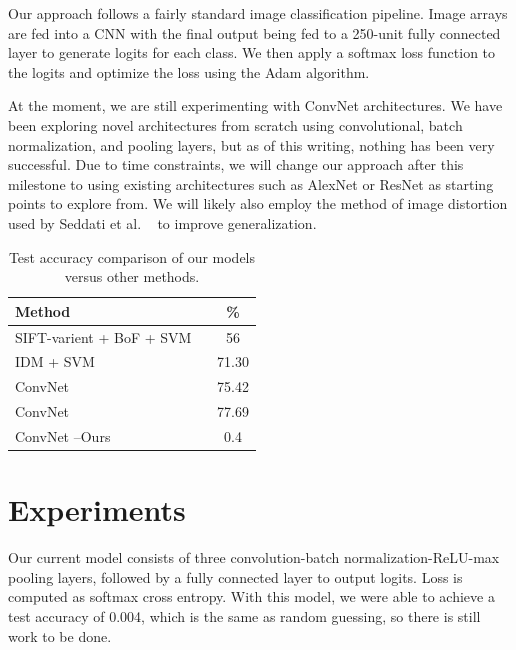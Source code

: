 \documentclass[10pt,twocolumn,letterpaper]{article}
\begin{document}
Our approach follows a fairly standard image classification pipeline. Image arrays are fed into a CNN with the final output being fed to a 250-unit fully connected layer to generate logits for each class. We then apply a softmax loss function to the logits and optimize the loss using the Adam algorithm.

At the moment, we are still experimenting with ConvNet architectures. We have been exploring novel architectures from scratch using convolutional, batch normalization, and pooling layers, but as of this writing, nothing has been very successful. Due to time constraints, we will change our approach after this milestone to using existing architectures such as AlexNet or ResNet as starting points to explore from. We will likely also employ the method of image distortion used by Seddati et al. ~\cite{seddati2015deepsketch} to improve generalization.

\begin{table}[h]
\begin{center}
\begin{tabular}{|l|c|}
\hline
Method & \% \\
\hline\hline
SIFT-varient + BoF + SVM  ~\cite{eitz2012hdhso}  &  56 \\
IDM + SVM ~\cite{yesilbek2015svm} & 71.30 \\
ConvNet ~\cite{seddati2015deepsketch}  & 75.42\\
ConvNet ~\cite{seddati2016deepsketch} & 77.69\\
ConvNet --Ours & 0.4 \\
\hline
\end{tabular}
\end{center}
\caption{Test accuracy comparison of our models versus other methods.}
\end{table}


\section{Experiments}
Our current model consists of three convolution-batch normalization-ReLU-max pooling layers, followed by a fully connected layer to output logits. Loss is computed as softmax cross entropy. With this model, we were able to achieve a test accuracy of 0.004, which is the same as random guessing, so there is still work to be done.
\end{document}
